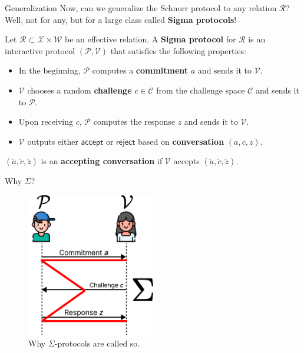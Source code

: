 \documentclass{zkdl-presentation-template}
\begin{document}
    \begin{frame}{Generalization}
        Now, can we generalize the Schnorr protocol to any relation $\mathcal{R}$? Well, not for any, but for a large class called \textbf{Sigma protocols}!

        \begin{definition}
            Let $\mathcal{R} \subset \mathcal{X} \times \mathcal{W}$ be an effective relation. A \textbf{Sigma protocol} for $\mathcal{R}$ is an interactive protocol $(\mathcal{P}, \mathcal{V})$ that satisfies the following properties:
            \begin{itemize}
                \item In the beginning, $\mathcal{P}$ computes a \textbf{commitment} $a$ and sends it to $\mathcal{V}$.
                \item $\mathcal{V}$ chooses a random \textbf{challenge} $c \in \mathcal{C}$ from the challenge space $\mathcal{C}$ and sends it to $\mathcal{P}$.
                \item Upon receiving $c$, $\mathcal{P}$ computes the response $z$ and sends it to $\mathcal{V}$.
                \item $\mathcal{V}$ outputs either $\mathsf{accept}$ or $\mathsf{reject}$ based on \textbf{conversation} $(a,c,z)$.
            \end{itemize}
        \end{definition}

        \begin{definition}
            $(\widetilde{a},\widetilde{c},\widetilde{z})$ is an \textbf{accepting conversation} if $\mathcal{V}$ accepts $(\widetilde{a},\widetilde{c},\widetilde{z})$.
        \end{definition}
    \end{frame}

    \begin{frame}{Why $\Sigma$?}
        \begin{figure}
        \centering
            \includegraphics[width=0.5\textwidth]{images/lecture_7/sigma_protocol_illustration.pdf}
            \caption{Why $\Sigma$-protocols are called so.}
        \end{figure}
    \end{frame}
\end{document}
